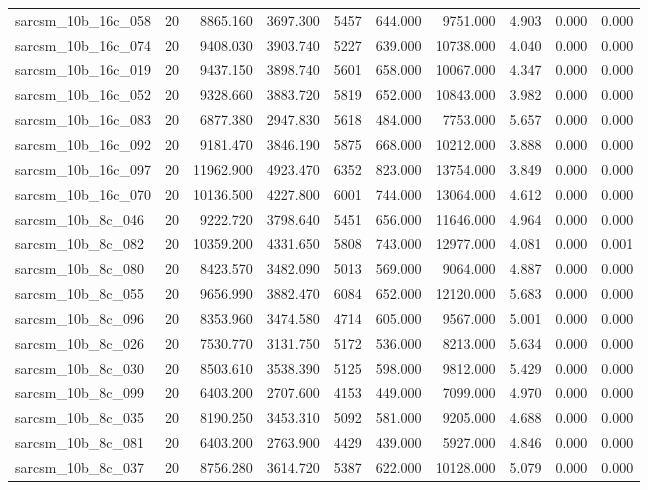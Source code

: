 \begin{tabular}{lrrrrrrrrr}
sarcsm\_10b\_16c\_058 & 20 & 8865.160 & 3697.300 & 5457 & 644.000 & 9751.000 & 4.903 & 0.000 & 0.000 \\
sarcsm\_10b\_16c\_074 & 20 & 9408.030 & 3903.740 & 5227 & 639.000 & 10738.000 & 4.040 & 0.000 & 0.000 \\
sarcsm\_10b\_16c\_019 & 20 & 9437.150 & 3898.740 & 5601 & 658.000 & 10067.000 & 4.347 & 0.000 & 0.000 \\
sarcsm\_10b\_16c\_052 & 20 & 9328.660 & 3883.720 & 5819 & 652.000 & 10843.000 & 3.982 & 0.000 & 0.000 \\
sarcsm\_10b\_16c\_083 & 20 & 6877.380 & 2947.830 & 5618 & 484.000 & 7753.000 & 5.657 & 0.000 & 0.000 \\
sarcsm\_10b\_16c\_092 & 20 & 9181.470 & 3846.190 & 5875 & 668.000 & 10212.000 & 3.888 & 0.000 & 0.000 \\
sarcsm\_10b\_16c\_097 & 20 & 11962.900 & 4923.470 & 6352 & 823.000 & 13754.000 & 3.849 & 0.000 & 0.000 \\
sarcsm\_10b\_16c\_070 & 20 & 10136.500 & 4227.800 & 6001 & 744.000 & 13064.000 & 4.612 & 0.000 & 0.000 \\
sarcsm\_10b\_8c\_046 & 20 & 9222.720 & 3798.640 & 5451 & 656.000 & 11646.000 & 4.964 & 0.000 & 0.000 \\
sarcsm\_10b\_8c\_082 & 20 & 10359.200 & 4331.650 & 5808 & 743.000 & 12977.000 & 4.081 & 0.000 & 0.001 \\
sarcsm\_10b\_8c\_080 & 20 & 8423.570 & 3482.090 & 5013 & 569.000 & 9064.000 & 4.887 & 0.000 & 0.000 \\
sarcsm\_10b\_8c\_055 & 20 & 9656.990 & 3882.470 & 6084 & 652.000 & 12120.000 & 5.683 & 0.000 & 0.000 \\
sarcsm\_10b\_8c\_096 & 20 & 8353.960 & 3474.580 & 4714 & 605.000 & 9567.000 & 5.001 & 0.000 & 0.000 \\
sarcsm\_10b\_8c\_026 & 20 & 7530.770 & 3131.750 & 5172 & 536.000 & 8213.000 & 5.634 & 0.000 & 0.000 \\
sarcsm\_10b\_8c\_030 & 20 & 8503.610 & 3538.390 & 5125 & 598.000 & 9812.000 & 5.429 & 0.000 & 0.000 \\
sarcsm\_10b\_8c\_099 & 20 & 6403.200 & 2707.600 & 4153 & 449.000 & 7099.000 & 4.970 & 0.000 & 0.000 \\
sarcsm\_10b\_8c\_035 & 20 & 8190.250 & 3453.310 & 5092 & 581.000 & 9205.000 & 4.688 & 0.000 & 0.000 \\
sarcsm\_10b\_8c\_081 & 20 & 6403.200 & 2763.900 & 4429 & 439.000 & 5927.000 & 4.846 & 0.000 & 0.000 \\
sarcsm\_10b\_8c\_037 & 20 & 8756.280 & 3614.720 & 5387 & 622.000 & 10128.000 & 5.079 & 0.000 & 0.000 \\

\end{tabular}

